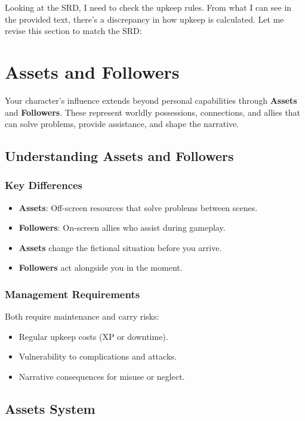 Looking at the SRD, I need to check the upkeep rules. From what I can see in the provided text, there's a discrepancy in how upkeep is calculated. Let me revise this section to match the SRD:

\chapter{Assets and Followers}
\label{ch:assets-followers}

Your character's influence extends beyond personal capabilities through \textbf{Assets} and \textbf{Followers}. These represent worldly possessions, connections, and allies that can solve problems, provide assistance, and shape the narrative.

\section{Understanding Assets and Followers}

\subsection*{Key Differences}
\begin{itemize}
\item \textbf{Assets}: Off-screen resources that solve problems between scenes.
\item \textbf{Followers}: On-screen allies who assist during gameplay.
\item \textbf{Assets} change the fictional situation before you arrive.
\item \textbf{Followers} act alongside you in the moment.
\end{itemize}

\subsection*{Management Requirements}
Both require maintenance and carry risks:
\begin{itemize}
\item Regular upkeep costs (XP or downtime).
\item Vulnerability to complications and attacks.
\item Narrative consequences for misuse or neglect.
\end{itemize}

\section{Assets System}

